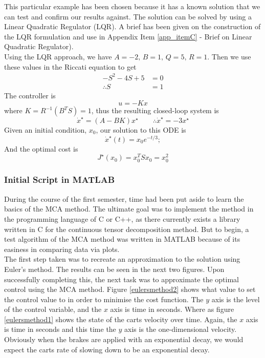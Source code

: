 \documentclass[11pt,draftd]{article}
\begin{document}
\noindent This particular example has been chosen because it has a known solution that we can test and confirm our results against. The solution can be solved by using a Linear Quadratic Regulator (LQR). A brief has been given on the construction of the LQR formulation and use in Appendix Item \ref{app_itemC} - Brief on Linear Quadratic Regulator). \\

\noindent Using the LQR approach, we have $ A = -2,\, B = 1,\, Q = 5,\, R = 1 $. Then we use these values in the Riccati equation to get
\begin{align*}
	-S^{2}-4S + 5 &= 0 \\
	\therefore S &= 1
\end{align*}
The controller is 
\begin{equation*}
	u = -Kx
\end{equation*}
where $ K = R^{-1}(B^{T}S) = 1 $, thus the resulting closed-loop system is
\begin{equation*}
	\dot{x}^{\star} = (A - BK) x^{\star}  \qquad \therefore \dot{x}^{\star} = -3x^{\star}
\end{equation*}
Given an initial condition, $ x_0 $, our solution to this ODE is
\begin{equation*}\label{key}
	\dot{x}^{\star}(t) = x_{0}e^{-t/3};
\end{equation*}
And the optimal cost is 
\begin{equation*}
	J^{\star}(x_0) = x_{0}^{T}Sx_{0}=x_{0}^{2}
\end{equation*}
\[\]

\subsubsection{Initial Script in MATLAB}
During the course of the first semester, time had been put aside to learn the basics of the MCA method. The ultimate goal was to implement the method in the programming language of C or C++, as there currently exists a library written in C for the continuous tensor decomposition method. But to begin, a test algorithm of the MCA method was written in MATLAB because of its easiness in comparing data via plots. \\

\noindent The first step taken was to recreate an approximation to the solution using Euler's method. The results can be seen in the next two figures. Upon successfully completing this, the next task was to approximate the optimal control using the MCA method. Figure \ref{eulersmethod2} shows what value to set the control value to in order to minimise the cost function. The $ y $ axis is the level of the control variable, and the $ x $ axis is time in seconds. Where as figure \ref{eulersmethod1} shows the state of the carts velocity over time. Again, the $ x $ axis is time in seconds and this time the $ y $ axis is the one-dimensional velocity. Obviously when the brakes are applied with an exponential decay, we would expect the carts rate of slowing down to be an exponential decay. 
\end{document}
